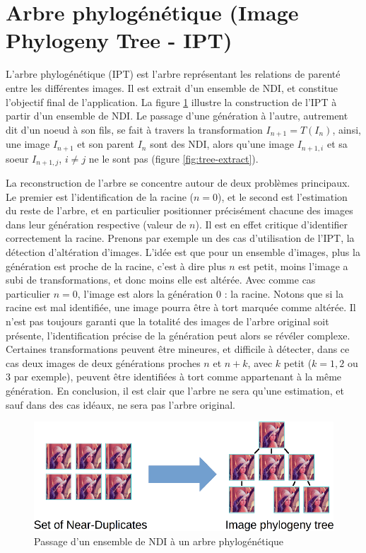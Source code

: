 \documentclass[utf8,final]{stageM2R} %
\begin{document}
\section{Arbre phylogénétique (Image Phylogeny Tree - IPT)}
\label{ipt}
L'arbre phylogénétique (IPT) est l'arbre représentant les relations de parenté entre les différentes images. Il est extrait d'un ensemble de NDI, et constitue l'objectif final de l'application. La figure \ref{fig:set-to-tree} illustre la construction de l'IPT à partir d'un ensemble de NDI. Le passage d'une génération à l'autre, autrement dit d'un noeud à son fils, se fait à travers la transformation $I_{n+1} = T(I_{n})$, ainsi, une image $I_{n+1}$ et son parent $I_{n}$ sont des NDI, alors qu'une image $I_{n+1,i}$ et sa soeur $I_{n+1,j}$, $i \neq j$ ne le sont pas (figure \ref{fig:tree-extract}).

La reconstruction de l'arbre se concentre autour de deux problèmes principaux. Le premier est l'identification de la racine ($n=0$), et le second est l'estimation du reste de l'arbre, et en particulier positionner précisément chacune des images dans leur génération respective (valeur de $n$). Il est en effet critique d'identifier correctement la racine. Prenons par exemple un des cas d'utilisation de l'IPT, la détection d'altération d'images. L'idée est que pour un ensemble d'images, plus la génération est proche de la racine, c'est à dire plus $n$ est petit, moins l'image a subi de transformations, et donc moins elle est altérée. Avec comme cas particulier $n = 0$, l'image est alors la génération $0$ : la racine. Notons que si la racine est mal identifiée, une image pourra être à tort marquée comme altérée.
Il n'est pas toujours garanti que la totalité des images de l'arbre original soit présente, l'identification précise de la génération peut alors se révéler complexe. Certaines transformations peuvent être mineures, et difficile à détecter, dans ce cas deux images de deux générations proches $n$ et $n+k$, avec $k$ petit ($k = 1, 2$ ou 3 par exemple), peuvent être identifiées à tort comme appartenant à la même génération. En conclusion, il est clair que l'arbre ne sera qu'une estimation, et sauf dans des cas idéaux, ne sera pas l'arbre original.

\begin{figure}
  \begin{center}
    \includegraphics[width=120mm]{images/set_to_tree}
    \caption{Passage d'un ensemble de NDI à un arbre phylogénétique}
    \label{fig:set-to-tree}
  \end{center}
\end{figure}
\end{document}
